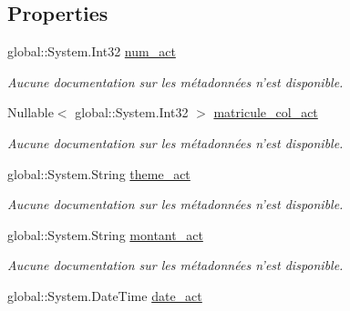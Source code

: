 \subsection*{Properties}
\begin{DoxyCompactItemize}
\item 
global\-::\-System.\-Int32 \hyperlink{class_model_1_1_a_c_t_i_v_i_t_e___c_o_m_p_l_e_m_e_n_t_a_i_r_e_a52209b9d343c9c1f6a0d6fd06ee11caf}{num\-\_\-act}
\begin{DoxyCompactList}\small\item\em Aucune documentation sur les métadonnées n'est disponible. \end{DoxyCompactList}\item 
Nullable$<$ global\-::\-System.\-Int32 $>$ \hyperlink{class_model_1_1_a_c_t_i_v_i_t_e___c_o_m_p_l_e_m_e_n_t_a_i_r_e_a68164855e37062f280439aece991e95f}{matricule\-\_\-col\-\_\-act}
\begin{DoxyCompactList}\small\item\em Aucune documentation sur les métadonnées n'est disponible. \end{DoxyCompactList}\item 
global\-::\-System.\-String \hyperlink{class_model_1_1_a_c_t_i_v_i_t_e___c_o_m_p_l_e_m_e_n_t_a_i_r_e_ac31dc74da88e2bba3a7878e0de1da922}{theme\-\_\-act}
\begin{DoxyCompactList}\small\item\em Aucune documentation sur les métadonnées n'est disponible. \end{DoxyCompactList}\item 
global\-::\-System.\-String \hyperlink{class_model_1_1_a_c_t_i_v_i_t_e___c_o_m_p_l_e_m_e_n_t_a_i_r_e_acc59469c7bb41fc47d357b1352b6e9bc}{montant\-\_\-act}
\begin{DoxyCompactList}\small\item\em Aucune documentation sur les métadonnées n'est disponible. \end{DoxyCompactList}\item 
global\-::\-System.\-Date\-Time \hyperlink{class_model_1_1_a_c_t_i_v_i_t_e___c_o_m_p_l_e_m_e_n_t_a_i_r_e_aacbeaa9cd3bfc61485c1ee7164d7a424}{date\-\_\-act}

\end{DoxyCompactItemize}
